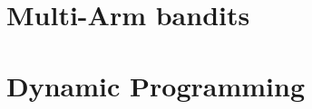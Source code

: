 \documentclass[12pt]{book}
\begin{document}

\chapter{ Multi-Arm bandits}
\label{chapter:MAB}




% 

% 

% 

% 

\appendix

\chapter{Dynamic Programming}
\label{chapter:dp}






%
%
%
\end{document}
